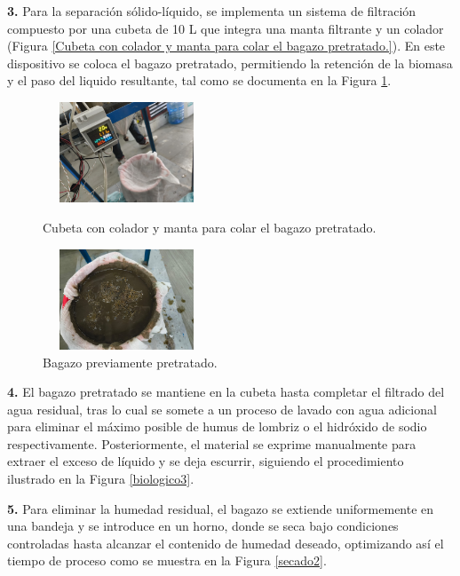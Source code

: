 \documentclass[12pt]{article}
\begin{document}
			
			\textbf{3.} Para la separación sólido-líquido, se implementa un sistema de filtración compuesto por una cubeta de 10 L que integra una manta filtrante y un colador (Figura \ref{Cubeta con colador y manta para colar el bagazo pretratado.}). En este dispositivo se coloca el bagazo pretratado, permitiendo la retención de la biomasa y el paso del liquido resultante, tal como se documenta en la Figura \ref{Bagazo1}.
 
				\begin{figure}[H]
				\centering
				\begin{minipage}{0.46\textwidth}
					\centering
					\includegraphics[width=5cm, height=3cm]{imagenes/biologico6} %
					\caption{Cubeta con colador y manta para colar el bagazo pretratado.}
					\label{Cubeta con colador y manta para colar el bagazo pretratado.}
				\end{minipage}
				\hfill
				\begin{minipage}{0.48\textwidth}
					\centering
					\includegraphics[width=5cm, height=3cm]{imagenes/bagazo_biologico_sacado} %
					\caption{Bagazo previamente pretratado.}
					\label{Bagazo1}
				\end{minipage}
			\end{figure}
	
	     \textbf{4.} El bagazo pretratado se mantiene en la cubeta hasta completar el filtrado del agua residual, tras lo cual se somete a un proceso de lavado con agua adicional para eliminar el máximo posible de humus de lombriz o el hidróxido de sodio respectivamente. Posteriormente, el material se exprime manualmente para extraer el exceso de líquido y se deja escurrir, siguiendo el procedimiento ilustrado en la Figura \ref{biologico3}.
	     
	
	\textbf{5.} Para eliminar la humedad residual, el bagazo se extiende uniformemente en una bandeja y se introduce en un horno, donde se seca bajo condiciones controladas hasta alcanzar el contenido de humedad deseado, optimizando así el tiempo de proceso como se muestra en la Figura \ref{secado2}. 
	
\end{document}
